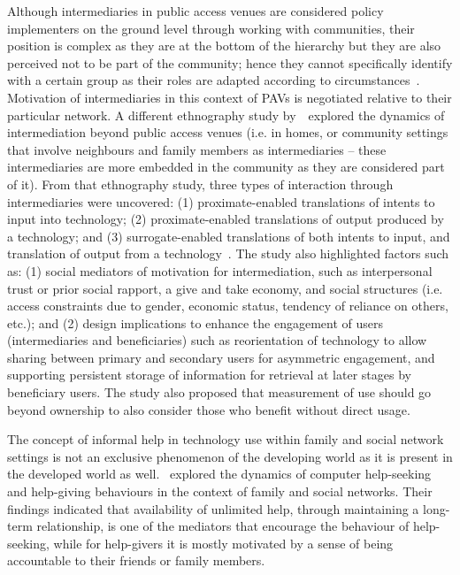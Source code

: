 Although intermediaries in public access venues are considered policy implementers on the ground level through working with communities, their position is complex as they are at the bottom of the hierarchy but they are also perceived not to be part of the community; hence they cannot specifically identify with a certain group as their roles are adapted according to circumstances~\citep{bailur2010liminal}. Motivation of intermediaries in this context of PAVs is negotiated relative to their particular network. A different ethnography study by~\cite{sambasivan2010}~explored the dynamics of intermediation beyond public access venues (i.e. in homes, or community settings that involve neighbours and family members as intermediaries -- these intermediaries are more embedded in the community as they are considered part of it). From that ethnography study, three types of interaction through intermediaries were uncovered: (1) proximate-enabled  translations of intents to input into technology; (2) proximate-enabled translations of output produced by a technology; and (3) surrogate-enabled translations of both intents to input, and translation of output from a technology~\citep{sambasivan2010}. The study also highlighted factors such as: (1) social mediators of motivation for intermediation, such as interpersonal trust or prior social rapport, a give and take economy, and social structures (i.e. access constraints due to gender, economic status, tendency of reliance on others, etc.); and (2) design implications to enhance the engagement of users (intermediaries and beneficiaries) such as reorientation of technology  to allow sharing between primary and secondary users for asymmetric engagement, and supporting persistent storage of information for retrieval at later stages by beneficiary users. The study also proposed that measurement of use should go beyond ownership to also consider those who benefit without direct usage. 

The concept of informal help in technology use within family and social network settings is not an exclusive phenomenon of the developing world as it is present in the developed world as well.~\cite{poole:chh} explored the dynamics of computer help-seeking and help-giving behaviours in the context of family and social networks. Their findings indicated that availability of unlimited help, through maintaining a long-term relationship, is one of the mediators that encourage the behaviour of help-seeking, while for help-givers it is mostly motivated by a sense of being accountable to their friends or family members.

